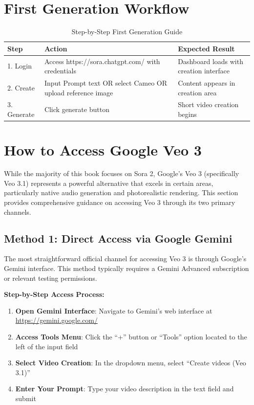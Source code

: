 \section*{First Generation Workflow}

\begin{table}[H]
\centering
\caption{Step-by-Step First Generation Guide \\ \authorillustration}
\label{tab:first-generation}
\begin{tabular}{p{2cm}p{5cm}p{6cm}}
\hline
\textbf{Step} & \textbf{Action} & \textbf{Expected Result} \\
\hline
1. Login & Access https://sora.chatgpt.com/ with credentials & Dashboard loads with creation interface \\
\hline
2. Create & Input Prompt text OR select Cameo OR upload reference image & Content appears in creation area \\
\hline
3. Generate & Click generate button & Short video creation begins \\
\hline
\end{tabular}
\end{table}

\section{How to Access Google Veo 3}
\label{sec:accessing-veo3}

While the majority of this book focuses on Sora 2, Google's Veo 3 (specifically Veo 3.1) represents a powerful alternative that excels in certain areas, particularly native audio generation and photorealistic rendering. This section provides comprehensive guidance on accessing Veo 3 through its two primary channels.

\subsection{Method 1: Direct Access via Google Gemini}

The most straightforward official channel for accessing Veo 3 is through Google's Gemini interface. This method typically requires a Gemini Advanced subscription or relevant testing permissions.

\textbf{Step-by-Step Access Process:}

\begin{enumerate}
\item \textbf{Open Gemini Interface}: Navigate to Gemini's web interface at \url{https://gemini.google.com/}
\item \textbf{Access Tools Menu}: Click the ``+'' button or ``Tools'' option located to the left of the input field
\item \textbf{Select Video Creation}: In the dropdown menu, select ``Create videos (Veo 3.1)''
\item \textbf{Enter Your Prompt}: Type your video description in the text field and submit
\end{enumerate}

